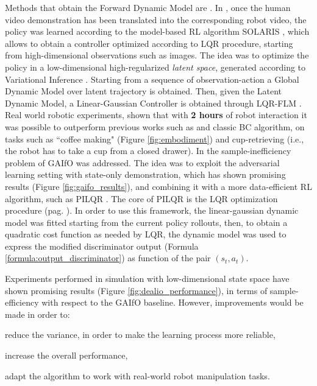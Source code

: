 
\newline Methods that obtain the Forward Dynamic Model are \cite{smith2019avid,torabi2021dealio}. In \cite{smith2019avid}, once the human video demonstration has been translated into the corresponding robot video, the policy was learned according to the model-based RL algorithm SOLARIS \cite{zhang2019solar}, which allows to obtain a controller optimized according to LQR procedure, starting from high-dimensional observations such as images. The idea was to optimize the policy in a low-dimensional high-regularized \textit{latent space}, generated according to Variational Inference \cite{Kingma2014_vae}. Starting from a sequence of observation-action a Global Dynamic Model over latent trajectory is obtained. Then, given the Latent Dynamic Model, a Linear-Gaussian Controller is obtained through LQR-FLM \cite{levine2014lqr_flm}. Real world robotic experiments, shown that with \textbf{2 hours} of robot interaction it was possible to outperform previous works such as \cite{sermanet2018time_contrastive,torabi2018bco} and classic BC algorithm, on tasks such as ``coffee making" (Figure \ref{fig:embodiment}) and cup-retrieving (i.e., the robot has to take a cup from a closed drawer). 
In \cite{torabi2021dealio} the sample-inefficiency problem of GAIfO \cite{torabi2018gaifo} was addressed. The idea was to exploit the adversarial learning setting with state-only demonstration, which has shown promising results (Figure \ref{fig:gaifo_results}), and combining it with a more data-efficient RL algorithm, such as PILQR \cite{chebotar2017pilqr}. The core of PILQR is the LQR optimization procedure (pag. \pageref{lqr}). In order to use this framework, the linear-gaussian dynamic model was fitted starting from the current policy rollouts, then, to obtain a quadratic cost function as needed by LQR, the dynamic model was used to express the modified discriminator output (Formula \ref{formula:output_discriminator}) as function of the pair $(s_{t},a_{t})$.

Experiments performed in simulation with low-dimensional state space have shown promising results (Figure \ref{fig:dealio_performance}), in terms of sample-efficiency with respect to the GAIfO baseline. However, improvements would be made in order to: \begin{enumerate*}[label=\textbf{(\arabic*)}]
    \item reduce the variance, in order to make the learning process more reliable,
    \item increase the overall performance,
    \item adapt the algorithm to work with real-world robot manipulation tasks.
\end{enumerate*}


